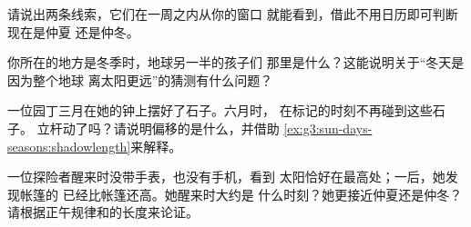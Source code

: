 \begin{exercise}[$\star$]\label{exo:g3:sun-days-seasons:8}
请说出两条线索，它们在一周之内从你的窗口
就能看到，借此不用日历即可判断现在是仲夏
还是仲冬。
\end{exercise}

\begin{exercise}[$\star$]\label{exo:g3:sun-days-seasons:9}
你所在的地方是冬季时，地球另一半的孩子们
那里是什么？这能说明关于“冬天是因为整个地球
离太阳更远”的猜测有什么问题？
\end{exercise}

\begin{exercise}[$\star\star$]\label{exo:g3:sun-days-seasons:10}
一位园丁三月在她的钟上摆好了石子。六月时，
在标记的时刻不再碰到这些石子。
立杆动了吗？请说明偏移的是什么，并借助
\cref{ex:g3:sun-days-seasons:shadowlength}来解释。
\end{exercise}

\begin{exercise}[$\star\star$]\label{exo:g3:sun-days-seasons:11}
一位探险者醒来时没带手表，也没有手机，看到
太阳恰好在最高处；一后，她发现帐篷的
已经比帐篷还高。她醒来时大约是
什么时刻？她更接近仲夏还是仲冬？
请根据正午规律和的长度来论证。
\end{exercise}
